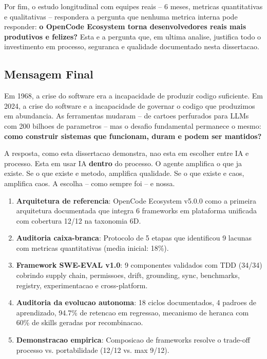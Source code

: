 \documentclass[12pt,a4paper,oneside,sumario=tradicional,chapter=TITLE,section=TITLE,subsection=TITLE,english,brazil]{abntex2}
\begin{document}
Por fim, o estudo longitudinal com equipes reais -- 6 meses, metricas quantitativas e qualitativas -- respondera a pergunta que nenhuma metrica interna pode responder: \textbf{o OpenCode Ecosystem torna desenvolvedores reais mais produtivos e felizes?} Esta e a pergunta que, em ultima analise, justifica todo o investimento em processo, seguranca e qualidade documentado nesta dissertacao.

\subsection{Mensagem Final}

Em 1968, a crise do software era a incapacidade de produzir codigo suficiente. Em 2024, a crise do software e a incapacidade de governar o codigo que produzimos em abundancia. As ferramentas mudaram -- de cartoes perfurados para LLMs com 200 bilhoes de parametros -- mas o desafio fundamental permanece o mesmo: \textbf{como construir sistemas que funcionam, duram e podem ser mantidos?}

A resposta, como esta dissertacao demonstra, nao esta em escolher entre IA e processo. Esta em usar IA \textbf{dentro} do processo. O agente amplifica o que ja existe. Se o que existe e metodo, amplifica qualidade. Se o que existe e caos, amplifica caos. A escolha -- como sempre foi -- e nossa.

\begin{enumerate}[leftmargin=*]
  \item \textbf{Arquitetura de referencia}: OpenCode Ecosystem v5.0.0 como a primeira arquitetura documentada que integra 6 frameworks em plataforma unificada com cobertura 12/12 na taxonomia 6D.
  \item \textbf{Auditoria caixa-branca}: Protocolo de 5 etapas que identificou 9 lacunas com metricas quantitativas (media inicial: 18\%).
  \item \textbf{Framework SWE-EVAL v1.0}: 9 componentes validados com TDD (34/34) cobrindo supply chain, permissoes, drift, grounding, sync, benchmarks, registry, experimentacao e cross-platform.
  \item \textbf{Auditoria da evolucao autonoma}: 18 ciclos documentados, 4 padroes de aprendizado, 94.7\% de retencao em regressao, mecanismo de heranca com 60\% de skills geradas por recombinacao.
  \item \textbf{Demonstracao empirica}: Composicao de frameworks resolve o trade-off processo vs. portabilidade (12/12 vs. max 9/12).
\end{enumerate}
\end{document}
